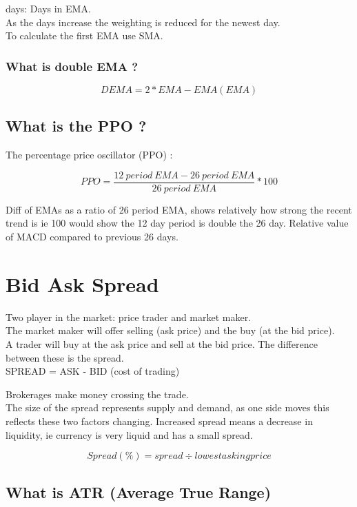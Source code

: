 \documentclass[11pt]{scrartcl} %
\begin{document}
days: Days in EMA.\\

As the days increase the weighting is reduced for the newest day.\\

To calculate the first EMA use SMA.

\subsubsection{What is double EMA ?}

\[ DEMA = 2*EMA - EMA(EMA) \]

\subsection{What is the PPO ?}

The percentage price oscillator (PPO) :

\[ PPO = \frac{12\:period\:EMA - 26\:period\:EMA}{26\:period\:EMA} *100 \]

Diff of EMAs as a ratio of 26 period EMA, shows relatively how strong the recent trend is ie 100 would
show the 12 day period is double the 26 day. Relative value of MACD compared to previous 26 days.

\section{Bid Ask Spread}

Two player in the market: price trader and market maker.\\

The market maker will offer selling (ask price) and the buy (at the bid price).\\

A trader will buy at the ask price and sell at the bid price. The difference between these is the
spread.\\

SPREAD = ASK - BID (cost of trading)

Brokerages make money crossing the trade.\\

The size of the spread represents supply and demand, as one side moves this reflects these two factors
changing. Increased spread means a decrease in liquidity, ie currency is very liquid and has a small spread.

\[ Spread(\%) = spread \div lowest asking price \]

\subsection{What is ATR (Average True Range)}
\end{document}
